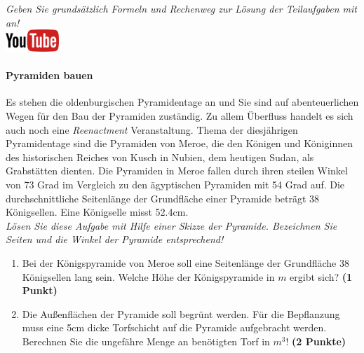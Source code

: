 \documentclass[a4paper, 9pt]{scrartcl}\usepackage[]{graphicx}\usepackage[]{xcolor}
\begin{document}
\textit{Geben Sie grunds{\"a}tzlich Formeln und Rechenweg zur L{\"o}sung der
  Teilaufgaben mit an!} \\[1Ex]

\hfill\href{https://youtu.be/tDgr6fpkkYA}{\includegraphics[width =
  2cm]{img/youtube}} %
\hspace{2Ex}

\paragraph{Pyramiden bauen}



Es stehen die oldenburgischen Pyramidentage an und Sie sind auf
abenteuerlichen Wegen f{\"u}r den Bau der Pyramiden zust{\"a}ndig. Zu allem
{\"U}berfluss handelt es sich auch noch eine \textit{Reenactment}
Veranstaltung. Thema der diesj{\"a}hrigen Pyramidentage sind die Pyramiden von
Meroe, die den K{\"o}nigen und K{\"o}niginnen des historischen Reiches von Kusch in
Nubien, dem heutigen Sudan, als Grabst{\"a}tten dienten. Die Pyramiden in Meroe
fallen durch ihren steilen Winkel von 73 Grad im Vergleich zu
den {\"a}gyptischen Pyramiden mit 54 Grad auf. Die durchschnittliche
Seitenl{\"a}nge der Grundfl{\"a}che einer Pyramide betr{\"a}gt 38 K{\"o}nigsellen. Eine K{\"o}nigselle
misst 52.4cm.\\

\textit{L{\"o}sen Sie diese Aufgabe mit Hilfe einer Skizze der Pyramide. Bezeichnen
  Sie Seiten und die Winkel der Pyramide entsprechend!}

\begin{enumerate}
\item Bei der K{\"o}nigspyramide von Meroe soll eine Seitenl{\"a}nge der Grundfl{\"a}che
  38 K{\"o}nigsellen lang sein. Welche H{\"o}he der K{\"o}nigspyramide in $m$
  ergibt sich? \textbf{(1 Punkt)}
\item Die Au{\ss}enfl{\"a}chen der Pyramide soll begr{\"u}nt werden. F{\"u}r die
  Bepflanzung muss eine 5cm dicke Torfschicht auf die
  Pyramide aufgebracht werden. Berechnen Sie die ungef{\"a}hre Menge an
  ben{\"o}tigten Torf in $m^3$! \textbf{(2 Punkte)}
\end{enumerate}
\end{document}
